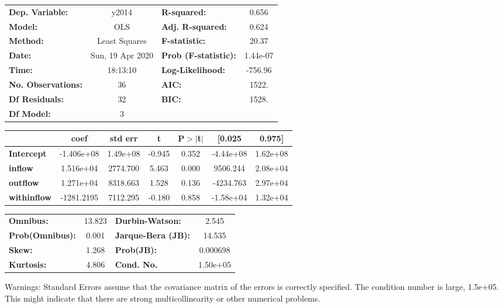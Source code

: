 \begin{center}
\begin{tabular}{lclc}
\toprule
\textbf{Dep. Variable:}    &      y2014       & \textbf{  R-squared:         } &     0.656   \\
\textbf{Model:}            &       OLS        & \textbf{  Adj. R-squared:    } &     0.624   \\
\textbf{Method:}           &  Least Squares   & \textbf{  F-statistic:       } &     20.37   \\
\textbf{Date:}             & Sun, 19 Apr 2020 & \textbf{  Prob (F-statistic):} &  1.44e-07   \\
\textbf{Time:}             &     18:13:10     & \textbf{  Log-Likelihood:    } &   -756.96   \\
\textbf{No. Observations:} &          36      & \textbf{  AIC:               } &     1522.   \\
\textbf{Df Residuals:}     &          32      & \textbf{  BIC:               } &     1528.   \\
\textbf{Df Model:}         &           3      & \textbf{                     } &             \\
\bottomrule
\end{tabular}
\begin{tabular}{lcccccc}
                    & \textbf{coef} & \textbf{std err} & \textbf{t} & \textbf{P$> |$t$|$} & \textbf{[0.025} & \textbf{0.975]}  \\
\midrule
\textbf{Intercept}  &   -1.406e+08  &     1.49e+08     &    -0.945  &         0.352        &    -4.44e+08    &     1.62e+08     \\
\textbf{inflow}     &    1.516e+04  &     2774.700     &     5.463  &         0.000        &     9506.244    &     2.08e+04     \\
\textbf{outflow}    &    1.271e+04  &     8318.663     &     1.528  &         0.136        &    -4234.763    &     2.97e+04     \\
\textbf{withinflow} &   -1281.2195  &     7112.295     &    -0.180  &         0.858        &    -1.58e+04    &     1.32e+04     \\
\bottomrule
\end{tabular}
\begin{tabular}{lclc}
\textbf{Omnibus:}       & 13.823 & \textbf{  Durbin-Watson:     } &    2.545  \\
\textbf{Prob(Omnibus):} &  0.001 & \textbf{  Jarque-Bera (JB):  } &   14.535  \\
\textbf{Skew:}          &  1.268 & \textbf{  Prob(JB):          } & 0.000698  \\
\textbf{Kurtosis:}      &  4.806 & \textbf{  Cond. No.          } & 1.50e+05  \\
\bottomrule
\end{tabular}
\end{center}

Warnings: \newline
 [1] Standard Errors assume that the covariance matrix of the errors is correctly specified. \newline
 [2] The condition number is large, 1.5e+05. This might indicate that there are \newline
 strong multicollinearity or other numerical problems.